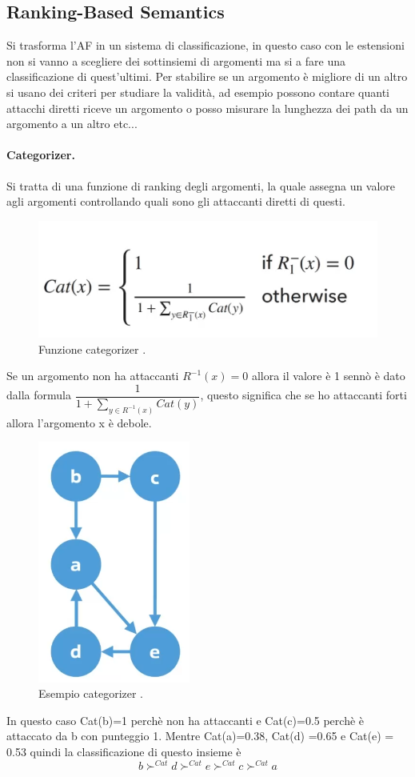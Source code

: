 \subsection{Ranking-Based Semantics}
Si trasforma l'AF in un sistema di classificazione, in questo caso con le estensioni non si vanno a scegliere dei sottinsiemi di argomenti ma si a fare una classificazione di quest'ultimi. Per stabilire se un argomento è migliore di un altro si usano dei criteri per studiare la validità, ad esempio possono contare quanti attacchi diretti riceve un argomento o posso misurare la lunghezza dei path da un argomento a un altro etc... 

\paragraph{Categorizer.} Si tratta di una funzione di ranking degli argomenti, la quale assegna un valore agli argomenti controllando quali sono gli attaccanti diretti di questi.

\begin{figure}[H]
    \centering
    \includegraphics[width=13cm, keepaspectratio]{img/categorizer.png}
    \caption{Funzione categorizer .}\label{fig:fun_categorizer}
\end{figure}
Se un argomento non ha attaccanti $R^{-1}(x) = 0$ allora il valore è 1 sennò è dato dalla formula $\dfrac{1}{1+ \sum_{y \in R^{-1}(x)}^{}Cat(y)}$, questo significa che se ho attaccanti forti allora l'argomento x è debole.
\begin{figure}[H]
    \centering
    \includegraphics[width=5cm, keepaspectratio]{img/es_categorizer.png}
    \caption{Esempio categorizer .}\label{fig:es_categorizer}
\end{figure}
In questo caso Cat(b)=1 perchè non ha attaccanti e Cat(c)=0.5 perchè è attaccato da b con punteggio 1. Mentre Cat(a)=0.38, Cat(d) =0.65 e Cat(e) = 0.53 quindi la classificazione di questo insieme è 
\[b\succ^{Cat}d\succ^{Cat}e\succ^{Cat}c\succ^{Cat}a\]

